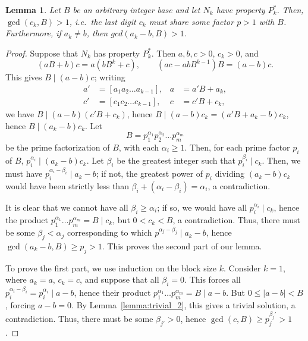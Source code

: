 \documentclass[sn-mathphys]{sn-jnl}%
\theoremstyle{thmstyleone}%
\newtheorem{lemma}[theorem]{Lemma}
\theoremstyle{thmstyletwo}%
\theoremstyle{thmstylethree}%
\begin{document}
\begin{appendices}
\begin{lemma}\label{lemma:gcds}
    Let $B$ be an arbitrary integer base and let $N_k$ have property 
    $P^*_k$. Then, $\gcd(c_k, B) > 1$, i.e.\ the last digit $c_k$ must share some
    factor $p > 1$ with $B$.
    Furthermore, if $a_k \neq b$, then $gcd(a_k - b, B) > 1$.
\end{lemma}
\begin{proof}
    Suppose that $N_k$ has property $P^*_k$. Then $a, b, c > 0$, $c_k > 0$, and \[
        (aB + b)c = a(bB^k + c), \qquad
        (ac - abB^{k - 1})B = (a - b)c.
    \] This gives $B \mid (a - b)c$; writing \begin{align*}
        a' &= [a_1a_2\dots a_{k - 1}], & a &= a'B + a_k, \\
        c' &= [c_1c_2\dots c_{k - 1}], & c &= c'B + c_k,
    \end{align*} 
    we have $B \mid (a - b)(c'B + c_k)$, hence $B\mid (a - b)c_k = (a'B + a_k - b)c_k$,
    hence $B \mid (a_k - b)c_k$. Let \[
        B = p_1^{\alpha_1}p_2^{\alpha_2}\dots p_m^{\alpha_m}
    \] be the prime factorization of $B$, with each $\alpha_i \geq 1$.
    Then, for each prime factor $p_i$ of $B$, $p_i^{\alpha_i}\mid (a_k - b)c_k$.
    Let $\beta_i$ be the greatest integer such that $p_i^{\beta_i} \mid c_k$.
    Then, we must have $p_i^{\alpha_i - \beta_i} \mid a_k - b$; if not, the greatest
    power of $p_i$ dividing $(a_k - b)c_k$ would have been strictly less than $\beta_i + 
    (\alpha_i - \beta_i) = \alpha_i$, a contradiction.

    It is clear that we cannot have all $\beta_i \geq \alpha_i$; if so, we would have all
    $p_i^{\alpha_i} \mid c_k$, hence the product $p_1^{\alpha_1}\dots p_m^{\alpha_m} = B
    \mid c_k$, but $0 < c_k < B$, a contradiction. Thus, there must be some $\beta_j <
    \alpha_j$ corresponding to which $p^{\alpha_j - \beta_j} \mid a_k - b$, hence 
    $\gcd(a_k - b, B) \geq p_j > 1$. This proves the second part of our lemma.

    To prove the first part, we use induction on the block size $k$.
    Consider $k = 1$, where $a_k = a$, $c_k = c$, and suppose that all $\beta_i = 0$. 
    This forces all $p_i^{\alpha_i - \beta_i} = p_i^{\alpha_i} \mid a - b$, hence 
    their product $p_1^{\alpha_1}\dots p_m^{\alpha_m} = B \mid a - b$. 
    But $0 \leq \vert a - b\vert < B$, forcing $a - b = 0$.
    By Lemma~\ref{lemma:trivial_2}, this gives a trivial solution, a contradiction.
    Thus, there must be some $\beta_{j'} > 0$, hence $\gcd(c, B) \geq p_j^{\beta_j'} > 1$.


\end{proof}
\end{appendices}
\end{document}
